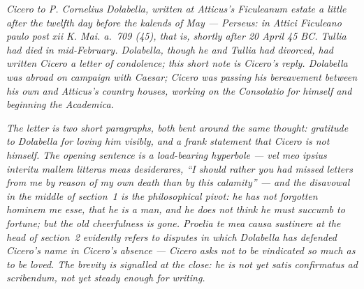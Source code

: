 
\textit{Cicero to P. Cornelius Dolabella, written at
Atticus's Ficuleanum estate a little after the twelfth
day before the kalends of May --- Perseus: \textit{in
Attici Ficuleano paulo post xii K. Mai. a.~709 (45)}, that
is, shortly after 20 April 45 BC. Tullia had died in
mid-February. Dolabella, though he and Tullia had
divorced, had written Cicero a letter of condolence; this
short note is Cicero's reply. Dolabella was abroad on
campaign with Caesar; Cicero was passing his bereavement
between his own and Atticus's country houses, working on
the \textit{Consolatio} for himself and beginning the
\textit{Academica}.}

\textit{The letter is two short paragraphs, both bent
around the same thought: gratitude to Dolabella for
loving him visibly, and a frank statement that Cicero is
not himself. The opening sentence is a load-bearing
hyperbole --- \textit{vel meo ipsius interitu mallem
litteras meas desiderares}, ``I should rather you had
missed letters from me by reason of my own death than by
this calamity'' --- and the disavowal in the middle of
section~1 is the philosophical pivot: he has not forgotten
\textit{hominem me esse}, that he is a man, and he does
not think he must \textit{succumb to fortune}; but the
old cheerfulness is gone. \textit{Proelia te mea causa
sustinere} at the head of section~2 evidently refers to
disputes in which Dolabella has defended Cicero's name in
Cicero's absence --- Cicero asks not to be vindicated so
much as to be loved. The brevity is signalled at the
close: he is not yet \textit{satis confirmatus ad
scribendum}, not yet steady enough for writing.}

